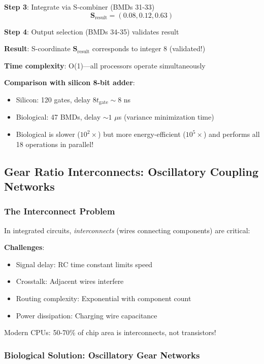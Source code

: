 \documentclass[11pt,a4paper]{article}
\begin{document}
\textbf{Step 3}: Integrate via S-combiner (BMDs 31-33)
\begin{equation}
\mathbf{S}_{\text{result}} = (0.08, 0.12, 0.63)
\end{equation}

\textbf{Step 4}: Output selection (BMDs 34-35) validates result

\textbf{Result}: S-coordinate $\mathbf{S}_{\text{result}}$ corresponds to integer 8 (validated!)

\textbf{Time complexity}: O(1)—all processors operate simultaneously

\textbf{Comparison with silicon 8-bit adder}:
\begin{itemize}
\item Silicon: 120 gates, delay $8t_{\text{gate}} \sim 8$ ns
\item Biological: 47 BMDs, delay $\sim 1$ $\mu$s (variance minimization time)
\item Biological is slower ($10^2\times$) but more energy-efficient ($10^5\times$) and performs all 18 operations in parallel!
\end{itemize}

\subsection{Gear Ratio Interconnects: Oscillatory Coupling Networks}

\subsubsection{The Interconnect Problem}

In integrated circuits, \textit{interconnects} (wires connecting components) are critical\cite{dally2001digital}:

\textbf{Challenges}:
\begin{itemize}
\item Signal delay: RC time constant limits speed
\item Crosstalk: Adjacent wires interfere
\item Routing complexity: Exponential with component count
\item Power dissipation: Charging wire capacitance
\end{itemize}

Modern CPUs: 50-70\% of chip area is interconnects, not transistors!

\subsubsection{Biological Solution: Oscillatory Gear Networks}
\end{document}

